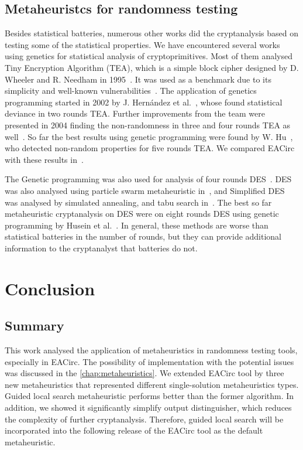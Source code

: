 \documentclass[
  print, %
  Table,   %
  nolof,     %
  nolot,     %
  11pt, %
  oneside  %
]{fithesis3}
\begin{document}
\section{Metaheuristcs for randomness testing}
\label{sec:relatwork-paper}

Besides statistical batteries, numerous other works did the cryptanalysis based on testing some of the statistical properties. We have encountered several works using genetics for statistical analysis of cryptoprimitives. Most of them analysed Tiny Encryption Algorithm (TEA), which is a simple block cipher designed by D. Wheeler and R. Needham in 1995~\cite{TEA}. It was used as a benchmark due to its simplicity and well-known vulnerabilities~\cite{TEAAttack}. The application of genetics programming started in 2002 by J. Hernández et al.~\cite{twoRoundsTea}, whose found statistical deviance in two rounds TEA. Further improvements from the team were presented in 2004 finding the non-randomness in three and four rounds TEA as well~\cite{fourRoundsTea}. So far the best results using genetic programming were found by W. Hu~\cite{fiveRoundsTea}, who detected non-random properties for five rounds TEA. We compared EACirc with these results in~\cite{2016-infocommunications-kubicek}.

The Genetic programming was also used for analysis of four rounds DES~\cite{song2007cryptanalysis}. DES was also analysed using particle swarm metaheuristic in~\cite{shahzad2009cryptanalysis}, and Simplified DES was analysed by simulated annealing, and tabu search in~\cite{nalini2005cryptanalysis}. The best so far metaheuristic cryptanalysis on DES were on eight rounds DES using genetic programming by Husein et al.~\cite{husein2007genetic}. In general, these methods are worse than statistical batteries in the number of rounds, but they can provide additional information to the cryptanalyst that batteries do not.


\chapter{Conclusion}
\label{chap:conclusion}

\section{Summary}
\label{sec:conclusion-summary}

This work analysed the application of metaheuristics in randomness testing tools, especially in EACirc. The possibility of implementation with the potential issues was discussed in the \cref{chap:metaheuristics}. We extended EACirc tool by three new metaheuristics that represented different single-solution metaheuristics types. Guided local search metaheuristic performs better than the former algorithm. In addition, we showed it significantly simplify output distinguisher, which reduces the complexity of further cryptanalysis. Therefore, guided local search will be incorporated into the following release of the EACirc tool as the default metaheuristic.
\end{document}

